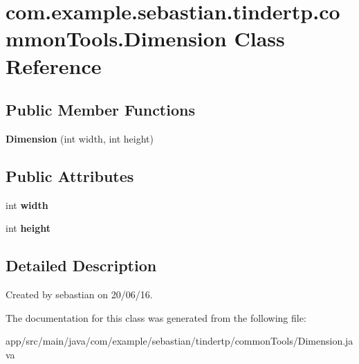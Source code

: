 \hypertarget{classcom_1_1example_1_1sebastian_1_1tindertp_1_1commonTools_1_1Dimension}{}\section{com.\+example.\+sebastian.\+tindertp.\+common\+Tools.\+Dimension Class Reference}
\label{classcom_1_1example_1_1sebastian_1_1tindertp_1_1commonTools_1_1Dimension}
\subsection*{Public Member Functions}
\begin{DoxyCompactItemize}
\item 
{\bfseries Dimension} (int width, int height)\hypertarget{classcom_1_1example_1_1sebastian_1_1tindertp_1_1commonTools_1_1Dimension_a46a59d6e8049bf75f0b1b2d45731cdce}{}\label{classcom_1_1example_1_1sebastian_1_1tindertp_1_1commonTools_1_1Dimension_a46a59d6e8049bf75f0b1b2d45731cdce}

\end{DoxyCompactItemize}
\subsection*{Public Attributes}
\begin{DoxyCompactItemize}
\item 
int {\bfseries width}\hypertarget{classcom_1_1example_1_1sebastian_1_1tindertp_1_1commonTools_1_1Dimension_a5d1f377e789d679450f75eac8fd5ce12}{}\label{classcom_1_1example_1_1sebastian_1_1tindertp_1_1commonTools_1_1Dimension_a5d1f377e789d679450f75eac8fd5ce12}

\item 
int {\bfseries height}\hypertarget{classcom_1_1example_1_1sebastian_1_1tindertp_1_1commonTools_1_1Dimension_a4ee29bcdd83baba61cca9f9be8bc93c3}{}\label{classcom_1_1example_1_1sebastian_1_1tindertp_1_1commonTools_1_1Dimension_a4ee29bcdd83baba61cca9f9be8bc93c3}

\end{DoxyCompactItemize}


\subsection{Detailed Description}
Created by sebastian on 20/06/16. 

The documentation for this class was generated from the following file\+:\begin{DoxyCompactItemize}
\item 
app/src/main/java/com/example/sebastian/tindertp/common\+Tools/Dimension.\+java\end{DoxyCompactItemize}
